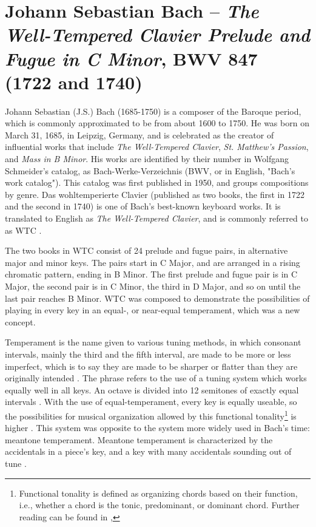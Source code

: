 \chapter[J.S. Bach and \textit{The Well-Tempered Clavier} BWV 847]{Johann Sebastian Bach – \textit{The Well-Tempered Clavier Prelude and Fugue in C Minor}, BWV 847 (1722 and 1740)}\label{bach}

Johann Sebastian (J.S.) Bach (1685-1750) is a composer of the Baroque period, which is commonly approximated to be from about 1600 to 1750. He was born on March 31, 1685, in Leipzig, Germany, and is celebrated as the creator of influential works that include \textit{The Well-Tempered Clavier}, \textit{St. Matthew's Passion}, and \textit{Mass in B Minor}. His works are identified by their number in Wolfgang Schmeider's catalog, as Bach-Werke-Verzeichnis (BWV, or in English, "Bach's work catalog"). This catalog was first published in 1950, and groups compositions by genre. Das wohltemperierte Clavier (published as two books, the first in 1722 and the second in 1740) is one of Bach's best-known keyboard works. It is translated to English as \textit{The Well-Tempered Clavier}, and is commonly referred to as WTC \autocite{Lindley_2001}.

The two books in WTC consist of 24 prelude and fugue pairs, in alternative major and minor keys. The pairs start in C Major, and are arranged in a rising chromatic pattern, ending in B Minor. The first prelude and fugue pair is in C Major, the second pair is in C Minor, the third in D Major, and so on until the last pair reaches B Minor. WTC was composed to demonstrate the possibilities of playing in every key in an equal-, or near-equal temperament, which was a new concept. 

Temperament is the name given to various tuning methods, in which consonant intervals, mainly the third and the fifth interval, are made to be more or less imperfect, which is to say they are made to be sharper or flatter than they are originally intended \autocite{Grove_1895}. The phrase  refers to the use of a tuning system which works equally well in all keys. An octave is divided into 12 semitones of exactly equal intervals \autocite{Whitcomb_2017}. With the use of equal-temperament, every key is equally useable, so the possibilities for musical organization allowed by this functional tonality\footnote{Functional tonality is defined as organizing chords based on their function, i.e., whether a chord is the tonic, predominant, or dominant chord. Further reading can be found in \citeauthor{Marshall_Emery_2019}, } is higher \autocite{Marshall_Emery_2019}. This system was opposite to the system more widely used in Bach's time: meantone temperament. Meantone temperament is characterized by the accidentals in a piece's key, and a key with many accidentals sounding out of tune \autocite{Grove_1895}. 

